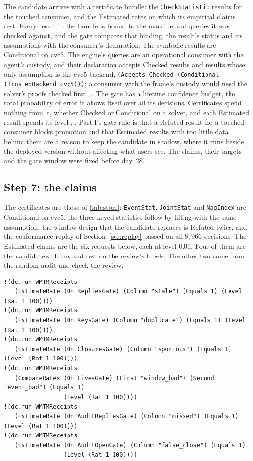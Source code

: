 \documentclass[11pt]{article}
\newcommand{\code}[1]{\texttt{#1}}
\theoremstyle{definition}
\theoremstyle{plain}
\begin{document}
The candidate arrives with a certificate bundle: the \code{CheckStatistic} results for the touched
consumer, and the Estimated rates on which its empirical claims rest. Every result in the bundle is
bound to the machine and queries it was checked against, and the gate compares that binding, the
result's status and its assumptions with the consumer's declaration. The symbolic results are
Conditional on cvc5. The engine's queries are an operational consumer with the agent's custody, and
their declaration accepts Checked results and results whose only assumption is the cvc5 backend,
\code{(Accepts Checked (Conditional (TrustedBackend cvc5)))}; a consumer with the frame's custody
would need the solver's proofs checked first \cite[Section~3.5]{part1}, \cite[Section~7.2]{part2}.
The gate has a lifetime confidence budget, the total probability of error it allows itself over all
its decisions. Certificates spend nothing from it, whether Checked or Conditional on a solver, and
each Estimated result spends its level \cite[Section~12.3]{part1}, \cite[Section~8.3]{part2}.
Part I's gate rule is that a Refuted result for a touched consumer blocks promotion and that
Estimated results with too little data behind them are a reason to keep the candidate in shadow,
where it runs beside the deployed version without affecting what users see. The claims, their
targets and the gate window were fixed before day~28.

\subsection{Step 7: the claims}\label{sec:claims}

The certificates are those of \cref{tab:store}: \code{EventStat}, \code{JointStat} and
\code{NagIndex} are Conditional on cvc5, the three keyed statistics follow by lifting with the same
assumption, the window design that the candidate replaces is Refuted twice, and the conformance
replay of Section~\ref{sec:replay} passed on all $8{,}966$ decisions. The Estimated claims are the six
requests below, each at level $0.01$. Four of them are the candidate's claims and rest on the
review's labels. The other two come from the random audit and check the review.

\begin{lstlisting}[style=mettamod]
!(dc.run WMTMReceipts
   (EstimateRate (On RepliesGate) (Column "stale") (Equals 1) (Level (Rat 1 100))))
!(dc.run WMTMReceipts
   (EstimateRate (On KeysGate) (Column "duplicate") (Equals 1) (Level (Rat 1 100))))
!(dc.run WMTMReceipts
   (EstimateRate (On ClosuresGate) (Column "spurious") (Equals 1) (Level (Rat 1 100))))
!(dc.run WMTMReceipts
   (CompareRates (On LivesGate) (First "window_bad") (Second "event_bad") (Equals 1)
                 (Level (Rat 1 100))))
!(dc.run WMTMReceipts
   (EstimateRate (On AuditRepliesGate) (Column "missed") (Equals 1) (Level (Rat 1 100))))
!(dc.run WMTMReceipts
   (EstimateRate (On AuditOpenGate) (Column "false_close") (Equals 1)
                 (Level (Rat 1 100))))
\end{lstlisting}
\end{document}
